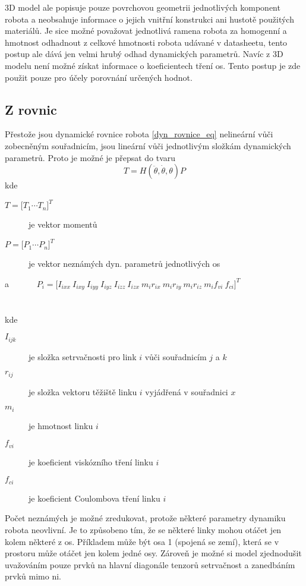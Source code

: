 3D model ale popisuje pouze povrchovou geometrii jednotlivých komponent robota a neobsahuje informace o jejich vnitřní konstrukci ani hustotě použitých materiálů. Je sice možné považovat jednotlivá ramena robota za homogenní a hmotnost
odhadnout z celkové hmotnosti robota udávané v datasheetu, tento postup ale dává jen velmi hrubý odhad dynamických parametrů. Navíc z 3D modelu není možné získat informace o koeficientech tření os. 
Tento postup je zde použit pouze pro účely porovnání určených hodnot.

\subsection{Z rovnic}

Přestože jsou dynamické rovnice robota \ref{dyn_rovnice_eq} nelineární vůči zobecněným souřadnicím, jsou lineární vůči jednotlivým složkám dynamických parametrů. Proto je možné je přepsat do tvaru
\begin{equation}
T = H(\ddot{\theta},\dot{\theta},\theta)P
\label{eq_lin_par}
\end{equation}
kde
\begin{description}
\item[$T = {\big[T_1  \dotsm  T_n\big]}^{T}$] je vektor momentů 
\item[$P = {\big[P_1  \dotsm  P_n\big]}^{T}$] je vektor neznámých dyn. parametrů jednotlivých os
\end{description} \noindent
a \ \ \ \ \ \ $P_i = {\big[I_{ixx} \ I_{ixy} \ I_{iyy} \ I_{iyz} \ I_{izz} \ I_{izx} \ m_ir_{ix} \ m_ir_{iy} \ m_ir_{iz} \ m_i f_{vi} \ f_{ci}\big]}^{T}$ \\
\\
\\
kde
\noindent
\begin{description}
\item[$I_{ijk}$] je složka setrvačnosti pro link $i$ vůči souřadnicím $j$ a $k$
\item[$r_{ij}$] je složka vektoru těžiště linku $i$ vyjádřená v souřadnici $x$
\item[$m_{i}$] je hmotnost linku $i$
\item[$f_{vi}$] je koeficient viskózního tření linku $i$
\item[$f_{ci}$] je koeficient Coulombova tření linku $i$
\end{description}

Počet neznámých je možné zredukovat, protože některé parametry dynamiku robota neovlivní. Je to způsobeno tím, že se některé linky mohou otáčet jen kolem některé z os. Příkladem může být osa 1 (spojená se zemí), která se v prostoru může otáčet jen kolem jedné osy. Zároveň je možné si model zjednodušit uvažováním pouze prvků na hlavní diagonále tenzorů setrvačnost a zanedbáním prvků mimo ni.

